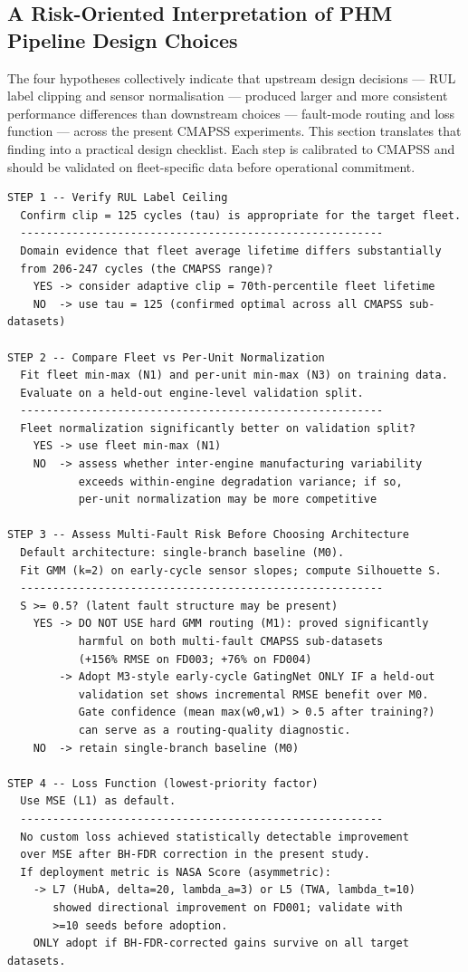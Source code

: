 \documentclass[preprint,10pt]{elsarticle}
\begin{document}
\subsection{A Risk-Oriented Interpretation of PHM Pipeline Design Choices}

The four hypotheses collectively indicate that upstream design decisions --- RUL label clipping and sensor normalisation --- produced larger and more consistent performance differences than downstream choices --- fault-mode routing and loss function --- across the present CMAPSS experiments. This section translates that finding into a practical design checklist. Each step is calibrated to CMAPSS and should be validated on fleet-specific data before operational commitment.
{\small\begin{verbatim}
STEP 1 -- Verify RUL Label Ceiling
  Confirm clip = 125 cycles (tau) is appropriate for the target fleet.
  --------------------------------------------------------
  Domain evidence that fleet average lifetime differs substantially
  from 206-247 cycles (the CMAPSS range)?
    YES -> consider adaptive clip = 70th-percentile fleet lifetime
    NO  -> use tau = 125 (confirmed optimal across all CMAPSS sub-datasets)

STEP 2 -- Compare Fleet vs Per-Unit Normalization
  Fit fleet min-max (N1) and per-unit min-max (N3) on training data.
  Evaluate on a held-out engine-level validation split.
  --------------------------------------------------------
  Fleet normalization significantly better on validation split?
    YES -> use fleet min-max (N1)
    NO  -> assess whether inter-engine manufacturing variability
           exceeds within-engine degradation variance; if so,
           per-unit normalization may be more competitive

STEP 3 -- Assess Multi-Fault Risk Before Choosing Architecture
  Default architecture: single-branch baseline (M0).
  Fit GMM (k=2) on early-cycle sensor slopes; compute Silhouette S.
  --------------------------------------------------------
  S >= 0.5? (latent fault structure may be present)
    YES -> DO NOT USE hard GMM routing (M1): proved significantly
           harmful on both multi-fault CMAPSS sub-datasets
           (+156% RMSE on FD003; +76% on FD004)
        -> Adopt M3-style early-cycle GatingNet ONLY IF a held-out
           validation set shows incremental RMSE benefit over M0.
           Gate confidence (mean max(w0,w1) > 0.5 after training?)
           can serve as a routing-quality diagnostic.
    NO  -> retain single-branch baseline (M0)

STEP 4 -- Loss Function (lowest-priority factor)
  Use MSE (L1) as default.
  --------------------------------------------------------
  No custom loss achieved statistically detectable improvement
  over MSE after BH-FDR correction in the present study.
  If deployment metric is NASA Score (asymmetric):
    -> L7 (HubA, delta=20, lambda_a=3) or L5 (TWA, lambda_t=10)
       showed directional improvement on FD001; validate with
       >=10 seeds before adoption.
    ONLY adopt if BH-FDR-corrected gains survive on all target datasets.
\end{verbatim}
}
\end{document}
